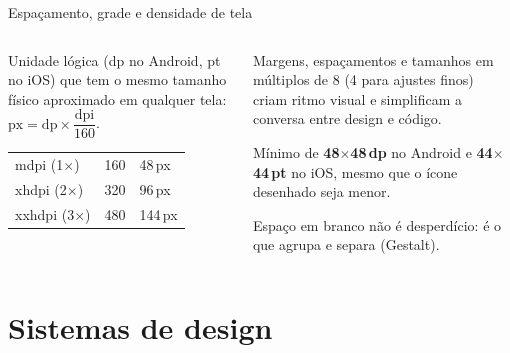 \documentclass[aspectratio=169,10pt]{beamer}
\begin{document}
\begin{frame}{Espaçamento, grade e densidade de tela}
  \begin{columns}[T]
    \begin{column}{0.5\textwidth}
      \begin{definicao}
        Unidade lógica (dp no Android, pt no iOS) que tem o mesmo tamanho físico aproximado em qualquer tela:\quad
        $\text{px} = \text{dp} \times \dfrac{\text{dpi}}{160}$.
      \end{definicao}
      \scriptsize
      \begin{tabularx}{\linewidth}{@{}l l L@{}}
        \toprule
         &  &  \\
        \midrule
        mdpi (1$\times$) & 160 & 48\,px \\
        xhdpi (2$\times$) & 320 & 96\,px \\
        xxhdpi (3$\times$) & 480 & 144\,px \\
        \bottomrule
      \end{tabularx}
    \end{column}
    \begin{column}{0.48\textwidth}
      \begin{conceito}[Grade de 8\,dp]
        Margens, espaçamentos e tamanhos em múltiplos de 8 (4 para ajustes finos) criam ritmo visual e simplificam a conversa entre design e código.
      \end{conceito}
      \begin{conceito}
        Mínimo de \textbf{48$\times$48\,dp} no Android e \textbf{44$\times$44\,pt} no iOS, mesmo que o ícone desenhado seja menor.
      \end{conceito}
      \begin{dica}
        Espaço em branco não é desperdício: é o que agrupa e separa (Gestalt).
      \end{dica}
    \end{column}
  \end{columns}
\end{frame}

\section{Sistemas de design}
\end{document}
